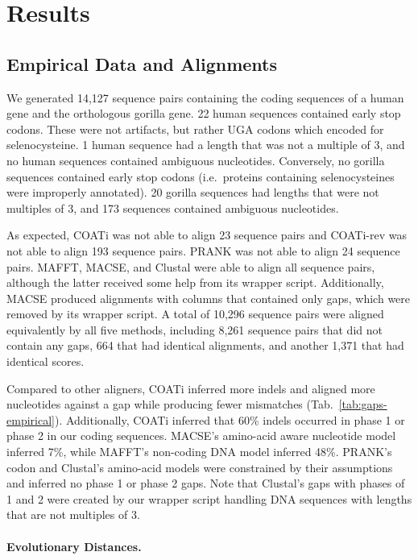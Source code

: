 \documentclass[12pt,letterpaper]{article}
\begin{document}
\section*{Results}

\subsection*{Empirical Data and Alignments}

We generated 14,127 sequence pairs containing the coding sequences of a human gene and the orthologous gorilla gene. 22 human sequences contained early stop codons. These were not artifacts, but rather UGA codons which encoded for selenocysteine. 1 human sequence had a length that was not a multiple of 3, and no human sequences contained ambiguous nucleotides. Conversely, no gorilla sequences contained early stop codons (i.e.\ proteins containing selenocysteines were improperly annotated). 20 gorilla sequences had lengths that were not multiples of 3, and 173 sequences contained ambiguous nucleotides.

As expected, COATi was not able to align 23 sequence pairs and COATi-rev was not able to align 193 sequence pairs. PRANK was not able to align 24 sequence pairs. MAFFT, MACSE, and Clustal\textOmega{} were able to align all sequence pairs, although the latter received some help from its wrapper script. Additionally, MACSE produced alignments with columns that contained only gaps, which were removed by its wrapper script.
A total of 10,296 sequence pairs were aligned equivalently by all five methods, including 8,261 sequence pairs that did not contain any gaps, 664 that had identical alignments, and another 1,371 that had identical scores.

Compared to other aligners, COATi inferred more indels and aligned more nucleotides against a gap while producing fewer mismatches (Tab.~\ref{tab:gaps-empirical}). Additionally, COATi inferred that 60\% indels occurred in phase 1 or phase 2 in our coding sequences. MACSE's amino-acid aware nucleotide model inferred 7\%, while MAFFT's non-coding DNA model inferred 48\%. PRANK's codon and Clustal\textOmega{}'s amino-acid models were constrained by their assumptions and inferred no phase 1 or phase 2 gaps. Note that Clustal\textOmega{}'s gaps with phases of 1 and 2 were created by our wrapper script handling DNA sequences with lengths that are not multiples of 3.  

\paragraph{Evolutionary Distances.}
\end{document}
